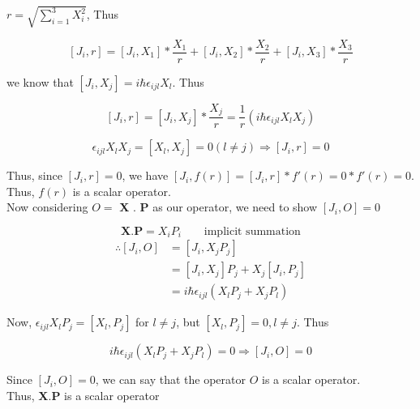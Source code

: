     $r = \sqrt{\sum_{i=1}^{3}X_{i}^{2}}$, Thus

    \begin{equation*}
        \left[ J_{i},r \right] = \left[ J_{i},X_{1} \right]*\frac{X_{1}}{r} + \left[ J_{i},X_{2} \right]*\frac{X_{2}}{r} + \left[ J_{i},X_{3} \right]*\frac{X_{3}}{r}
    \end{equation*}

    we know that $\left[ J_{i}, X_{j}\right] = i\hbar\epsilon_{ijl}X_{l}$. Thus

    \begin{equation*}
        \left[ J_{i},r \right] = \left[ J_{i},X_{j} \right]*\frac{X_{j}}{r} = \frac{1}{r}\left(i\hbar\epsilon_{ijl}X_{l}X_{j}\right)
    \end{equation*}

    \begin{equation*}
        \epsilon_{ijl}X_{l}X_{j} = \left[ X_{l},X_{j}\right] = 0 (l \neq j) \Rightarrow \left[ J_{i},r \right] = 0
    \end{equation*}

    Thus, since $\left[ J_{i},r \right] = 0$, we have $\left[ J_{i},f(r) \right] = \left[ J_{i},r \right]*f'(r) = 0*f'(r) = 0$.\\
    Thus, $f(r)$ is a scalar operator.\\

    Now considering $O =$ \textbf{X} . \textbf{P} as our operator, we need to show $ \left[ J_{i},O \right] = 0 $

    \begin{equation*}
        \mathbf{X}.\mathbf{P} = X_{i}P_{i} \qquad {\text{implicit summation}}
    \end{equation*}
        \begin{equation*}
        \begin{split}
            \therefore \left[ J_{i},O \right] & = \left[ J_{i}, X_{j}P_{j} \right] \\
            & = \left[ J_{i}, X_{j} \right]P_{j} + X_{j}\left[ J_{i}, P_{j} \right] \\
            & = i\hbar\epsilon_{ijl}(X_{l}P_{j} + X_{j}P_{l})
        \end{split}
    \end{equation*}

    Now, $\epsilon_{ijl}X_{l}P_{j} = [X_{l}, P_{j}]$ for $l \neq j$, but $[X_{l}, P_{j}] = 0, l \neq j$. Thus

    \begin{equation*}
            i\hbar\epsilon_{ijl}(X_{l}P_{j} + X_{j}P_{l}) = 0 \Rightarrow [J_{i}, O] = 0
    \end{equation*}

    Since $[J_{i}, O] = 0$, we can say that the operator $O$ is a scalar operator.\\
    Thus, \textbf{X}.\textbf{P} is a scalar operator

